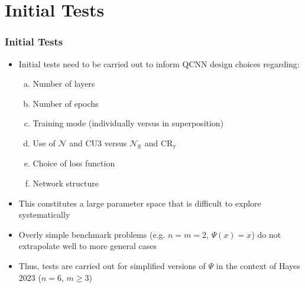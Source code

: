 \documentclass{beamer}
\begin{document}
\section{Initial Tests}
\begin{frame}
\frametitle{Initial Tests}
\begin{itemize}
\item Initial tests need to be carried out to \alert{inform QCNN design choices} regarding:
\begin{enumerate}[(a)]
\item Number of layers
\item Number of epochs 
\item Training mode (individually versus in superposition)
\item Use of $\mathcal{N}$ and $\text{CU}3$ versus $\mathcal{N}_\mathbb{R}$ and $\text{CR}_\text{y}$ 
\item Choice of loss function
\item Network structure
\end{enumerate}
\item This constitutes a \alert{large parameter space} that is difficult to explore systematically
\item Overly simple benchmark problems (e.g.
$n=m=2$, $\Psi(x)=x$) do not extrapolate well to more general cases 
\item Thus, tests are carried out for simplified versions of $\Psi$ in the context of Hayes 2023 ($n=6$, $m \geq 3$)
\end{itemize}
\end{frame}
\end{document}
